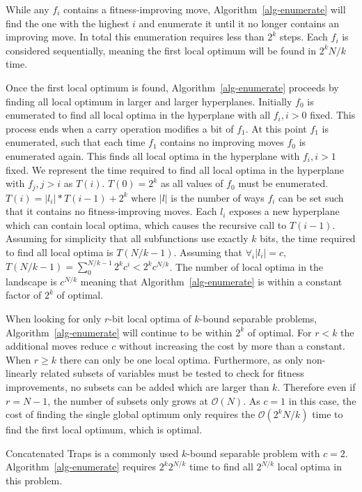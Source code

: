 \documentclass[runningheads,a4paper]{llncs}
\newcommand{\BigO}[1]{$\mathcal{O}{(#1)}$}
\begin{document}
While any $f_i$ contains a fitness-improving move, Algorithm~\ref{alg-enumerate}
will find the one with the highest $i$ and enumerate it until it no longer
contains an improving move. In total this enumeration requires less than $2^k$
steps. Each $f_i$ is considered sequentially, meaning the first local optimum
will be found in $2^kN/k$ time.

Once the first local optimum is found, Algorithm~\ref{alg-enumerate} proceeds
by finding all local optimum in larger and larger hyperplanes. Initially $f_0$
is enumerated to find all local optima in the hyperplane with all $f_i, i>0$
fixed. This process ends when a carry operation modifies a bit of $f_1$. At
this point $f_1$ is enumerated, such that each time $f_1$ contains no improving moves
$f_0$ is enumerated again. This finds all local optima in the hyperplane with $f_i, i>1$
fixed. We represent the time required to find all local optima in the hyperplane
with $f_j, j>i$ as $T(i)$. $T(0)=2^k$ as all values of $f_0$ must be enumerated.
$T(i) = |l_i|*T(i-1)+2^k$ where $|l|$ is the number of ways $f_i$ can be set such
that it contains no fitness-improving moves. Each $l_i$ exposes a new hyperplane
which can contain local optima, which causes the recursive call to $T(i-1)$.
Assuming for simplicity that all subfunctions use exactly $k$ bits,
the time required to find all local optima is $T(N/k-1)$.
Assuming that $\forall_i |l_i|=c$, $T(N/k-1)=\sum_0^{N/k-1}2^kc^i<2^kc^{N/k}$.
The number of local optima in the landscape is $c^{N/k}$ meaning that Algorithm~\ref{alg-enumerate}
is within a constant factor of $2^k$ of optimal.

When looking for only $r$-bit local optima of $k$-bound separable problems,
Algorithm~\ref{alg-enumerate} will continue to be within $2^k$ of optimal.
For $r < k$ the additional moves reduce $c$ without increasing the cost
by more than a constant.
When $r \geq k$ there can only be one local optima. Furthermore, as
only non-linearly related subsets of variables must be tested to check
for fitness improvements, no subsets can be added which are larger than $k$.
Therefore even if $r=N-1$, the number of subsets only grows at \BigO{N}.
As $c=1$ in this case, the cost of finding the single global optimum
only requires the \BigO{2^kN/k} time to find the first local optimum, which is
optimal.

Concatenated Traps is a commonly used $k$-bound separable problem
with $c=2$.  Algorithm~\ref{alg-enumerate} requires $2^k2^{N/k}$ time
to find all $2^{N/k}$ local optima in this problem.
\end{document}
